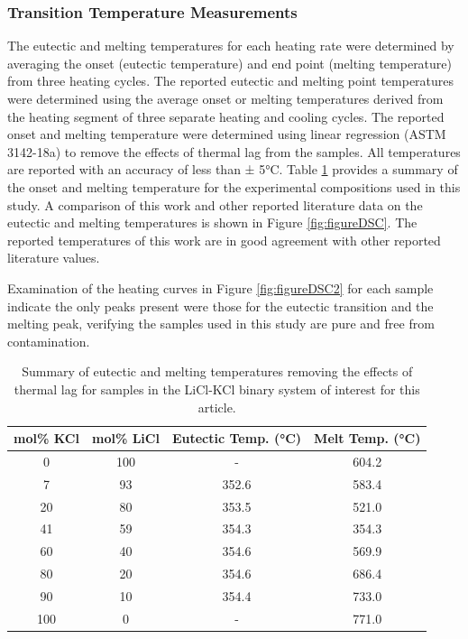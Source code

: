 \documentclass[review]{elsarticle}
\begin{document}
\FloatBarrier

\subsubsection{Transition Temperature Measurements}

The eutectic and melting temperatures for each heating rate were determined by averaging the onset (eutectic temperature) and end point (melting temperature) from three heating cycles. The reported eutectic and melting point temperatures were determined using the average onset or melting temperatures derived from the heating segment of three separate heating and cooling cycles. The reported onset and melting temperature were determined using linear regression (ASTM 3142-18a) to remove the effects of thermal lag from the samples. All temperatures are reported with an accuracy of less than ± 5°C. Table \ref{tableDSC} provides a summary of the onset and melting temperature for the experimental compositions used in this study. A comparison of this work and other reported literature data on the eutectic and melting temperatures is shown in Figure \ref{fig:figureDSC}. The reported temperatures of this work are in good agreement with other reported literature values. 

Examination of the heating curves in Figure \ref{fig:figureDSC2} for each sample indicate the only peaks present were those for the eutectic transition and the melting peak, verifying the samples used in this study are pure and free from contamination. 

\begin{table}[h]
\centering
\caption{Summary of eutectic and melting temperatures removing the effects of thermal lag for samples in the LiCl-KCl binary system of interest for this article.}
\begin{tabular}{|c|c|c|c|}
\hline
mol\% KCl & mol\% LiCl & Eutectic Temp. (°C) & Melt Temp. (°C)\\
\hline
0       & 100        & -            & 604.2 \\
7       & 93         & 352.6        & 583.4 \\
20      & 80         & 353.5        & 521.0 \\
41      & 59         & 354.3        & 354.3 \\
60      & 40         & 354.6        & 569.9 \\
80      & 20         & 354.6        & 686.4 \\
90      & 10         & 354.4        & 733.0 \\
100     & 0          & -            & 771.0 \\
\hline
\end{tabular}
\label{tableDSC}
\end{table}
\end{document}
